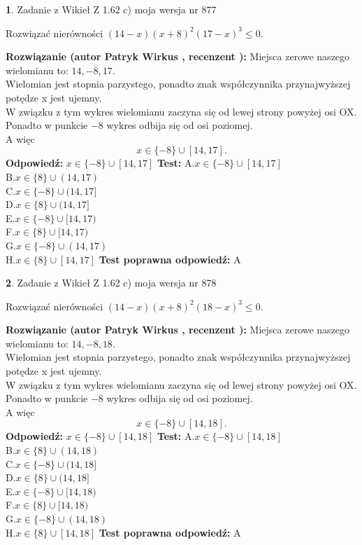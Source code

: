 \documentclass[12pt, a4paper]{article}
\theoremstyle{definition} %
\newtheorem{zad}{}
\newcommand{\zadStart}[1]{\begin{zad}#1\newline}
\newcommand{\zadStop}{\end{zad}}
\newcommand{\rozwStart}[2]{\noindent \textbf{Rozwiązanie (autor #1 , recenzent #2): }\newline}
\newcommand{\rozwStop}{\newline}
\newcommand{\odpStart}{\noindent \textbf{Odpowiedź:}\newline}
\newcommand{\odpStop}{\newline}
\newcommand{\testStart}{\noindent \textbf{Test:}\newline}
\newcommand{\testStop}{\newline}
\newcommand{\kluczStart}{\noindent \textbf{Test poprawna odpowiedź:}\newline}
\newcommand{\kluczStop}{\newline}
\begin{document}
\zadStart{Zadanie z Wikieł Z 1.62 c) moja wersja nr 877}

Rozwiązać nierówności $(14-x)(x+8)^{2}(17-x)^{3}\le0$.
\zadStop
\rozwStart{Patryk Wirkus}{}
Miejsca zerowe naszego wielomianu to: $14, -8, 17$.\\
Wielomian jest stopnia parzystego, ponadto znak współczynnika przy\linebreak najwyższej potędze x jest ujemny.\\ W związku z tym wykres wielomianu zaczyna się od lewej strony powyżej osi OX.\\
Ponadto w punkcie $-8$ wykres odbija się od osi poziomej.\\
A więc $$x \in \{-8\} \cup [14,17].$$
\rozwStop
\odpStart
$x \in \{-8\} \cup [14,17]$
\odpStop
\testStart
A.$x \in \{-8\} \cup [14,17]$\\
B.$x \in \{8\} \cup (14,17)$\\
C.$x \in \{-8\} \cup (14,17]$\\
D.$x \in \{8\} \cup (14,17]$\\
E.$x \in \{-8\} \cup [14,17)$\\
F.$x \in \{8\} \cup [14,17)$\\
G.$x \in \{-8\} \cup (14,17)$\\
H.$x \in \{8\} \cup [14,17]$
\testStop
\kluczStart
A
\kluczStop



\zadStart{Zadanie z Wikieł Z 1.62 c) moja wersja nr 878}

Rozwiązać nierówności $(14-x)(x+8)^{2}(18-x)^{3}\le0$.
\zadStop
\rozwStart{Patryk Wirkus}{}
Miejsca zerowe naszego wielomianu to: $14, -8, 18$.\\
Wielomian jest stopnia parzystego, ponadto znak współczynnika przy\linebreak najwyższej potędze x jest ujemny.\\ W związku z tym wykres wielomianu zaczyna się od lewej strony powyżej osi OX.\\
Ponadto w punkcie $-8$ wykres odbija się od osi poziomej.\\
A więc $$x \in \{-8\} \cup [14,18].$$
\rozwStop
\odpStart
$x \in \{-8\} \cup [14,18]$
\odpStop
\testStart
A.$x \in \{-8\} \cup [14,18]$\\
B.$x \in \{8\} \cup (14,18)$\\
C.$x \in \{-8\} \cup (14,18]$\\
D.$x \in \{8\} \cup (14,18]$\\
E.$x \in \{-8\} \cup [14,18)$\\
F.$x \in \{8\} \cup [14,18)$\\
G.$x \in \{-8\} \cup (14,18)$\\
H.$x \in \{8\} \cup [14,18]$
\testStop
\kluczStart
A
\kluczStop
\end{document}
